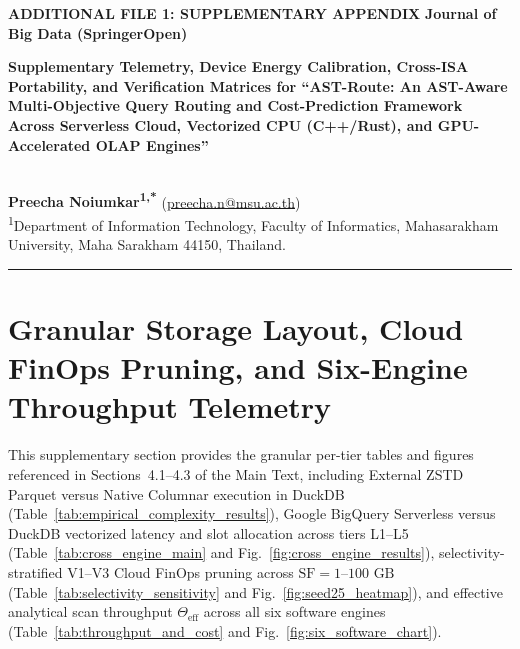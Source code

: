 \documentclass[10pt,a4paper]{article}
\begin{document}
{\footnotesize\sffamily\color{springerblue}\textbf{ADDITIONAL FILE 1: SUPPLEMENTARY APPENDIX} \hfill \textbf{Journal of Big Data (SpringerOpen)}}\\[0.6em]
{\raggedright\Large\sffamily\bfseries Supplementary Telemetry, Device Energy Calibration, Cross-ISA Portability, and Verification Matrices for ``AST-Route: An AST-Aware Multi-Objective Query Routing and Cost-Prediction Framework Across Serverless Cloud, Vectorized CPU (C++/Rust), and GPU-Accelerated OLAP Engines''}\\[0.5em]
{\normalsize\textbf{Preecha Noiumkar\textsuperscript{1,*}}} (\href{mailto:preecha.n@msu.ac.th}{preecha.n@msu.ac.th})\\
\textsuperscript{1}Department of Information Technology, Faculty of Informatics, Mahasarakham University, Maha Sarakham 44150, Thailand.\\[0.4em]
\noindent\rule{\textwidth}{0.8pt}

\section{Granular Storage Layout, Cloud FinOps Pruning, and Six-Engine Throughput Telemetry}
This supplementary section provides the granular per-tier tables and figures referenced in Sections~4.1--4.3 of the Main Text, including External ZSTD Parquet versus Native Columnar execution in DuckDB (Table~\ref{tab:empirical_complexity_results}), Google BigQuery Serverless versus DuckDB vectorized latency and slot allocation across tiers L1--L5 (Table~\ref{tab:cross_engine_main} and Fig.~\ref{fig:cross_engine_results}), selectivity-stratified V1--V3 Cloud FinOps pruning across $\text{SF}=1\text{--}100\text{ GB}$ (Table~\ref{tab:selectivity_sensitivity} and Fig.~\ref{fig:seed25_heatmap}), and effective analytical scan throughput $\Theta_{\text{eff}}$ across all six software engines (Table~\ref{tab:throughput_and_cost} and Fig.~\ref{fig:six_software_chart}).
\end{document}
